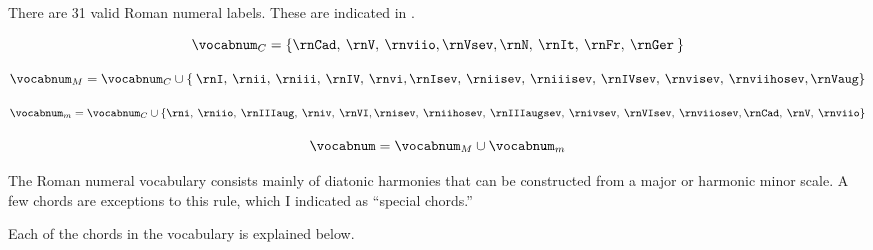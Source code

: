 
There are 31 valid Roman numeral labels. These are indicated
in .



\begin{equation}
    \vocabnum_{C} = \{ \rnCad, \: \rnV, \: \rnviio,
                \rnVsev, \rnN, \: \rnIt, \: \rnFr, \: \rnGer \: \}
\end{equation}

\begin{equation}
    \vocabnum_{M} = \vocabnum_{C} \cup \{ \: \rnI, \: \rnii, \: \rniii, \: \rnIV, \: \rnvi,
                \rnIsev, \: \rniisev, \: \rniiisev, \: \rnIVsev, \: 
                \rnvisev, \: \rnviihosev, \rnVaug \}
\end{equation}


\begin{equation}
    \vocabnum_{m} = \vocabnum_{C} \cup  \{ \rni, \: \rniio, \: \rnIIIaug, \: \rniv, \: \rnVI,
                \rnisev, \: \rniihosev, \: \rnIIIaugsev, \: \rnivsev, \: \rnVIsev, \: \rnviiosev,
                \rnCad, \: \rnV, \: \rnviio \}
\end{equation}

\begin{equation}
    \vocabnum = \vocabnum_{M} \cup \vocabnum_{m}
\end{equation}

                

The Roman numeral vocabulary consists mainly of diatonic
harmonies that can be constructed from a major or harmonic
minor scale. A few chords are exceptions to this rule, \:
which I indicated as ``special chords.''

Each of the chords in the vocabulary is explained below.


